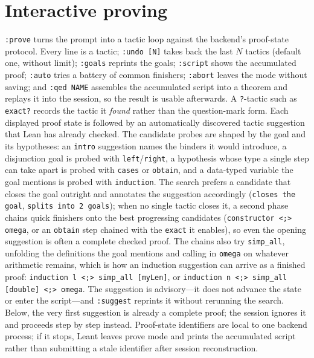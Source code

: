 \documentclass[11pt,oneside]{article}
\newcommand{\code}[1]{\texttt{#1}}
\begin{document}
\section{Interactive proving}\label{sec:prove}

\code{:prove} turns the prompt into a tactic loop against the
backend's proof-state protocol. Every line is a tactic; \code{:undo
[N]} takes back the last $N$ tactics (default one, without limit);
\code{:goals} reprints the goals; \code{:script} shows the accumulated
proof; \code{:auto} tries a battery of common finishers; \code{:abort}
leaves the mode without saving; and \code{:qed NAME} assembles the
accumulated script into a theorem and replays it into the session, so
the result is usable afterwards.  A \code{?}-tactic such as
\code{exact?} records the tactic it \emph{found} rather than the
question-mark form.  Each displayed proof state is followed by an automatically
discovered tactic suggestion that Lean has already checked.  The
candidate probes are shaped by the goal and its hypotheses: an
\code{intro} suggestion names the binders it would introduce, a
disjunction goal is probed with \code{left}/\code{right}, a
hypothesis whose type a single step can take apart is probed with
\code{cases} or \code{obtain}, and a data-typed variable the goal
mentions is probed with \code{induction}.  The search prefers a
candidate that closes the goal outright and annotates the suggestion
accordingly (\code{closes the goal}, \code{splits into 2 goals}); when
no single tactic closes it, a second phase chains quick finishers onto
the best progressing candidates (\code{constructor <;> omega}, or an
\code{obtain} step chained with the \code{exact} it enables), so even
the opening suggestion is often a complete checked proof.  The chains
also try \code{simp\_all}, unfolding the definitions the goal mentions
and calling in \code{omega} on whatever arithmetic remains, which is
how an induction suggestion can arrive as a finished proof:
\code{induction l <;> simp\_all [myLen]}, or
\code{induction n <;> simp\_all [double] <;> omega}.
The suggestion is advisory---it does not advance the state or enter the
script---and \code{:suggest} reprints it without rerunning the search.
Below, the very first suggestion is already a complete proof; the session
ignores it and proceeds step by step instead.
Proof-state identifiers are local to one backend process; if it stops,
Leant leaves prove mode and prints the accumulated script rather than
submitting a stale identifier after session reconstruction.
\end{document}
